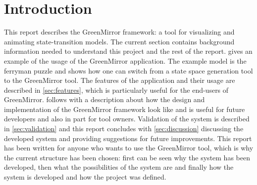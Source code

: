 \section{Introduction}\label{sec:intro}
This report describes the GreenMirror framework: a tool for visualizing and animating state-transition models. The current section contains background information needed to understand this project and the rest of the report.  gives an example of the usage of the GreenMirror application. The example model is the ferryman puzzle and shows how one can switch from a state space generation tool to the GreenMirror tool. The features of the application and their usage are described in \cref{sec:features}, which is particularly useful for the end-users of GreenMirror.  follows with a description about how the design and implementation of the GreenMirror framework look like and is useful for future developers and also in part for tool owners. Validation of the system is described in \cref{sec:validation} and this report concludes with \cref{sec:discussion} discussing the developed system and providing suggestions for future improvements. This report has been written for anyone who wants to use the GreenMirror tool, which is why the current structure has been chosen: first can be seen why the system has been developed, then what the possibilities of the system are and finally how the system is developed and how the project was defined.
